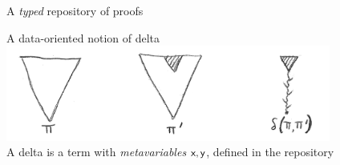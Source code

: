 \documentclass[ignorenonframetext,red]{beamer}
\begin{document}
\begin{frame}[fragile]{A \emph{typed} repository of proofs}
\begin{center}
  \end{center}
\end{frame}

\begin{frame}{A data-oriented notion of delta}
  {\centering\includegraphics[width=0.80\textwidth]{images/delta.png}\\}%
  A delta is a term with \emph{metavariables} $\textsf{x}, \textsf{y}$,
  defined in the repository
\end{frame}
\end{document}

